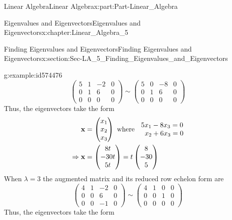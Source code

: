 \documentclass[oneside,10pt,]{book}
\numberwithin{equation}{section}
\newcommand{\amp}{&}
\begin{document}
\begin{partptx}{Linear Algebra}{}{Linear Algebra}{}{}{x:part:Part-Linear_Algebra}
\begin{chapterptx}{Eigenvalues and Eigenvectors}{}{Eigenvalues and Eigenvectors}{}{}{x:chapter:Linear_Algebra_5}
\begin{sectionptx}{Finding Eigenvalues and Eigenvectors}{}{Finding Eigenvalues and Eigenvectors}{}{}{x:section:Sec-LA_5_Finding_Eigenvalues_and_Eigenvectors}
\begin{example}{}{g:example:id574476}
\begin{equation*}
\begin{pmatrix} 5 \amp 1 \amp -2 \amp 0 \\ 0 \amp 1 \amp 6 \amp 0 \\ 0 \amp 0 \amp 0 \amp 0 \end{pmatrix} \sim \begin{pmatrix} 5 \amp 0 \amp -8 \amp 0 \\ 0 \amp 1 \amp 6 \amp 0 \\ 0 \amp 0 \amp 0 \amp 0 \end{pmatrix} 
\end{equation*}
Thus, the eigenvectors take the form%
\begin{align*}
\mathbf{x} \amp =\begin{pmatrix} x_1 \\ x_2 \\ x_3 \end{pmatrix} \textrm{ where } \begin{matrix}  \hspace{2mm} 5x_1-8x_3=0 \\ \hspace{4mm} x_2+6x_3=0 \end{matrix} \\
\Rightarrow \mathbf{x} \amp =\begin{pmatrix} 8t \\ -30t \\ 5t \end{pmatrix} = t\begin{pmatrix} 8 \\ -30 \\ 5 \end{pmatrix}
\end{align*}
When \(\lambda=3\) the augmented matrix and its reduced row echelon form are%
\begin{equation*}
\begin{pmatrix} 4 \amp 1 \amp -2 \amp 0 \\ 0 \amp 0 \amp 6 \amp 0 \\ 0 \amp 0 \amp -1 \amp 0 \end{pmatrix} \sim \begin{pmatrix} 4 \amp 1 \amp 0 \amp 0 \\ 0 \amp 0 \amp 1 \amp 0 \\ 0 \amp 0 \amp 0 \amp 0 \end{pmatrix} 
\end{equation*}
Thus, the eigenvectors take the form%
\begin{align*}

\end{align*}
\end{example}
\end{sectionptx}
\end{chapterptx}
\end{partptx}
\end{document}
